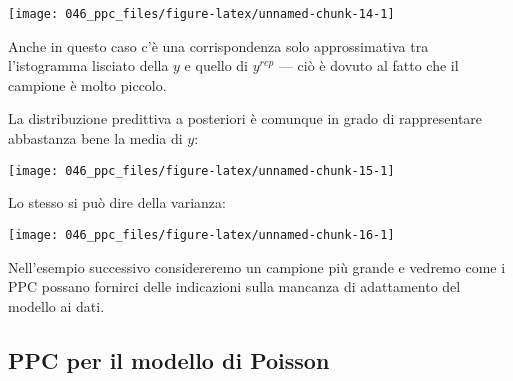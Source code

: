 \documentclass[
]{memoir}
\newenvironment{Shaded}{\begin{snugshade}}{\end{snugshade}}
\newcommand{\AttributeTok}[1]{\textcolor[rgb]{0.77,0.63,0.00}{#1}}
\newcommand{\DecValTok}[1]{\textcolor[rgb]{0.00,0.00,0.81}{#1}}
\newcommand{\FunctionTok}[1]{\textcolor[rgb]{0.00,0.00,0.00}{#1}}
\newcommand{\NormalTok}[1]{#1}
\newcommand{\SpecialCharTok}[1]{\textcolor[rgb]{0.00,0.00,0.00}{#1}}
\newcommand{\StringTok}[1]{\textcolor[rgb]{0.31,0.60,0.02}{#1}}
\theoremstyle{definition}
\theoremstyle{definition}
\theoremstyle{definition}
\theoremstyle{definition}
\theoremstyle{remark}
\begin{document}
\begin{Shaded}
\end{Shaded}

\begin{center}\texttt{[image: 046\_ppc\_files/figure-latex/unnamed-chunk-14-1]} \end{center}

Anche in questo caso c'è una corrispondenza solo approssimativa tra l'istogramma lisciato della \(y\) e quello di \(y^{rep}\) --- ciò è dovuto al fatto che il campione è molto piccolo.

La distribuzione predittiva a posteriori è comunque in grado di rappresentare abbastanza bene la media di \(y\):

\begin{Shaded}
\end{Shaded}

\begin{center}\texttt{[image: 046\_ppc\_files/figure-latex/unnamed-chunk-15-1]} \end{center}

\noindent
Lo stesso si può dire della varianza:

\begin{Shaded}
\end{Shaded}

\begin{center}\texttt{[image: 046\_ppc\_files/figure-latex/unnamed-chunk-16-1]} \end{center}

Nell'esempio successivo considereremo un campione più grande e vedremo come i PPC possano fornirci delle indicazioni sulla mancanza di adattamento del modello ai dati.

\hypertarget{ppc-per-il-modello-di-poisson}{%
\subsection{PPC per il modello di Poisson}\label{ppc-per-il-modello-di-poisson}}
\end{document}
